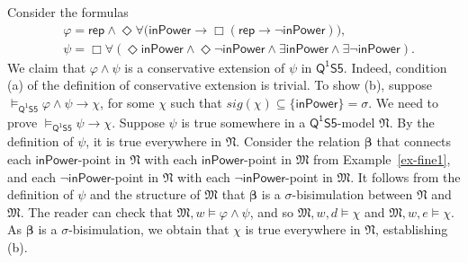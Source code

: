 \documentclass{lmcs} %
\theoremstyle{plain}\newtheorem{satz}[thm]{Satz} %
\newcommand{\nb}[1]{\textcolor{red}{\bf!}%
	\marginpar[\parbox{15mm}{\raggedleft\scriptsize\textcolor{red}{#1}}]%
	{\parbox{15mm}{\raggedright\scriptsize\textcolor{red}{#1}}}}
\newcommand{\sig}{\mathit{sig}}
\newcommand{\FOMS}{\ensuremath{\mathsf{Q^1S5}}}
\newcommand{\bs}{\boldsymbol{\beta}}
\begin{document}
\begin{exa}\label{example9} 
Consider the formulas
%
\begin{align*}
&\varphi = \mathsf{rep} \wedge \Diamond \forall  \big(\mathsf{inPower} \rightarrow \Box (\mathsf{rep} \rightarrow \neg \mathsf{inPower}) \big),\\
%
& \psi = \Box \forall (\Diamond \mathsf{inPower} \wedge \Diamond \neg \mathsf{inPower} \wedge \exists \mathsf{inPower} \wedge \exists \neg \mathsf{inPower}). 
\end{align*}
%
We claim that $\varphi \wedge \psi$ is a conservative extension of $\psi$ in $\FOMS$.  %
%
%
Indeed, condition (a) of the definition of conservative extension is trivial. To show (b), suppose $\models_{\FOMS} \varphi \land \psi \to \chi$, for some $\chi$ such that $\sig(\chi) \subseteq \{\mathsf{inPower}\} = \sigma$. We need to prove $\models_{\FOMS} \psi \to \chi$. Suppose $\psi$ is true somewhere in a \FOMS-model $\mathfrak N$. By the definition of $\psi$, it is true everywhere in $\mathfrak N$. Consider the relation $\bs$ that connects each $\mathsf{inPower}$-point in $\mathfrak N$ with each $\mathsf{inPower}$-point in $\mathfrak M$ from Example~\ref{ex-fine1}, and each $\neg\mathsf{inPower}$-point in $\mathfrak N$ with each $\neg\mathsf{inPower}$-point in $\mathfrak M$. It follows from the definition of $\psi$ and the structure of $\mathfrak M$ that $\bs$ is a $\sigma$-bisimulation between $\mathfrak N$ and $\mathfrak M$. The reader can check that $\mathfrak M,w \models \varphi \land \psi$, and so $\mathfrak M,w,d \models \chi$ and $\mathfrak M,w,e \models \chi$. As $\bs$ is a $\sigma$-bisimulation, we obtain that $\chi$ is true everywhere in $\mathfrak N$, establishing (b).


\end{exa}
\end{document}
